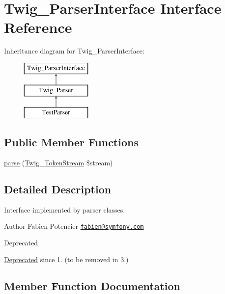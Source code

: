 \hypertarget{interfaceTwig__ParserInterface}{}\section{Twig\+\_\+\+Parser\+Interface Interface Reference}
\label{interfaceTwig__ParserInterface}
Inheritance diagram for Twig\+\_\+\+Parser\+Interface\+:\begin{figure}[H]
\begin{center}
\leavevmode
\includegraphics[height=3.000000cm]{interfaceTwig__ParserInterface}
\end{center}
\end{figure}
\subsection*{Public Member Functions}
\begin{DoxyCompactItemize}
\item 
\hyperlink{interfaceTwig__ParserInterface_ac936e3c188977ad3708a54e818d427ec}{parse} (\hyperlink{classTwig__TokenStream}{Twig\+\_\+\+Token\+Stream} \$stream)
\end{DoxyCompactItemize}


\subsection{Detailed Description}
Interface implemented by parser classes.

\begin{DoxyAuthor}{Author}
Fabien Potencier \href{mailto:fabien@symfony.com}{\tt fabien@symfony.\+com}
\end{DoxyAuthor}
\begin{DoxyRefDesc}{Deprecated}
\item[\hyperlink{deprecated__deprecated000034}{Deprecated}]since 1. (to be removed in 3.) \end{DoxyRefDesc}


\subsection{Member Function Documentation}

